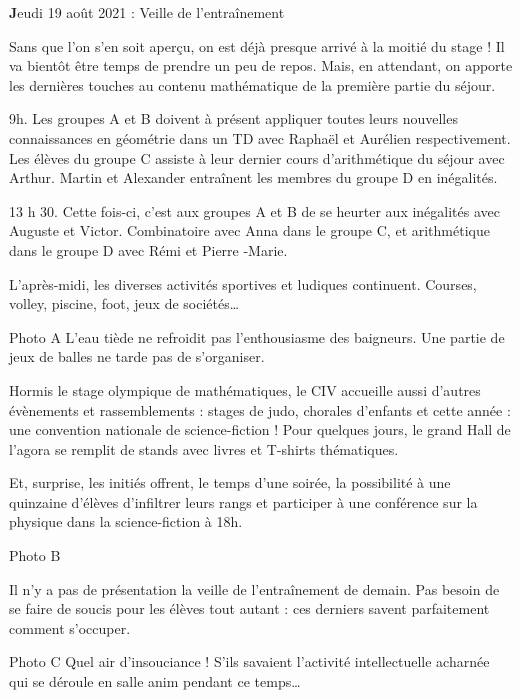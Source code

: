 \begin{center}
{\textbf Jeudi 19 août 2021 : Veille de l’entraînement}
\end{center}
\vspace{2mm}

Sans que l’on s’en soit aperçu, on est déjà presque arrivé à la moitié du stage ! Il va bientôt être temps de prendre un peu de repos. Mais, en attendant, on apporte les dernières touches au contenu mathématique de la première partie du séjour.

9h. Les groupes A et B doivent à présent appliquer toutes leurs nouvelles connaissances en géométrie dans un TD avec Raphaël et Aurélien respectivement. Les élèves du groupe C assiste à leur dernier cours d’arithmétique du séjour avec Arthur. Martin et Alexander entraînent les membres du groupe D en inégalités.

13 h 30. Cette fois-ci, c’est aux groupes A et B de se heurter aux inégalités avec Auguste et Victor. Combinatoire avec Anna dans le groupe C, et arithmétique dans le groupe D avec Rémi et Pierre -Marie.

L’après-midi, les diverses activités sportives et ludiques continuent. Courses, volley, piscine, foot, jeux de sociétés…

Photo A
L’eau tiède ne refroidit pas l’enthousiasme des baigneurs. Une partie de jeux de balles ne tarde pas de s’organiser.

Hormis le stage olympique de mathématiques, le CIV accueille aussi d’autres évènements et rassemblements : stages de judo, chorales d’enfants et cette année : une convention nationale de science-fiction ! Pour quelques jours, le grand Hall de l’agora se remplit de stands avec livres et T-shirts thématiques.

Et, surprise, les initiés offrent, le temps d’une soirée, la possibilité à une quinzaine d’élèves d’infiltrer leurs rangs et participer à une conférence sur la physique dans la science-fiction à 18h.

Photo B

Il n’y a pas de présentation la veille de l’entraînement de demain. Pas besoin de se faire de soucis pour les élèves tout autant : ces derniers savent parfaitement comment s’occuper.

Photo C
Quel air d’insouciance ! S’ils savaient l'activité intellectuelle acharnée qui se déroule en salle anim pendant ce temps…